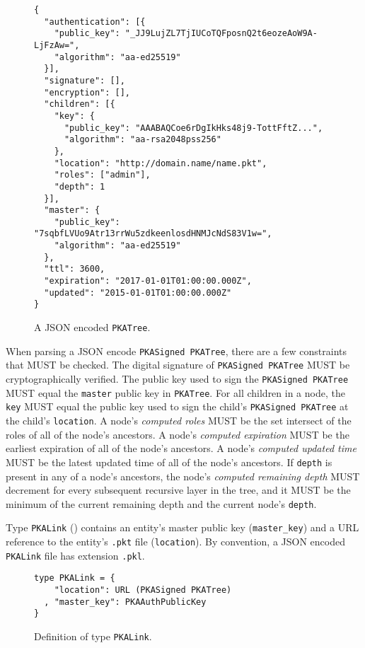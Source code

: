 \documentclass{article}
\newcommand{\pkap}{PKAP}
\newcommand{\todo}[1]{\textcolor{red}{#1}}
\begin{document}
\begin{figure}[h!]
\begin{lstlisting}
{
  "authentication": [{
    "public_key": "_JJ9LujZL7TjIUCoTQFposnQ2t6eozeAoW9A-LjFzAw=",
    "algorithm": "aa-ed25519"
  }],
  "signature": [],
  "encryption": [],
  "children": [{
    "key": {
      "public_key": "AAABAQCoe6rDgIkHks48j9-TottFftZ...",
      "algorithm": "aa-rsa2048pss256"
    },
    "location": "http://domain.name/name.pkt",
    "roles": ["admin"],
    "depth": 1
  }],
  "master": {
    "public_key": "7sqbfLVUo9Atr13rrWu5zdkeenlosdHNMJcNdS83V1w=",
    "algorithm": "aa-ed25519"
  },
  "ttl": 3600,
  "expiration": "2017-01-01T01:00:00.000Z",
  "updated": "2015-01-01T01:00:00.000Z"
}
\end{lstlisting}
\caption{A JSON encoded \texttt{PKATree}.}
\label{example:pkatree:tree}
\end{figure}


When parsing a JSON encode \texttt{PKASigned PKATree}, there are a few constraints that MUST be checked. 
The digital signature of \texttt{PKASigned PKATree} MUST be cryptographically verified. 
The public key used to sign the \texttt{PKASigned PKATree} MUST equal the \texttt{master} public key in \texttt{PKATree}. 
For all children in a node, the \texttt{key} MUST equal the public key used to sign the child's \texttt{PKASigned PKATree} at the child's \texttt{location}. 
A node's \emph{computed roles} MUST be the set intersect of the roles of all of the node's ancestors. 
A node's \emph{computed expiration} MUST be the earliest expiration of all of the node's ancestors. 
A node's \emph{computed updated time} MUST be the latest updated time of all of the node's ancestors. 
If \texttt{depth} is present in any of a node's ancestors, the node's \emph{computed remaining depth} MUST decrement for every subsequent recursive layer in the tree, and it MUST be the minimum of the current remaining depth and the current node's \texttt{depth}. 

Type \texttt{PKALink} () contains an entity's master public key (\texttt{master\_key}) and a URL reference to the entity's \texttt{.pkt} file (\texttt{location}). 
By convention, a JSON encoded \texttt{PKALink} file has extension \texttt{.pkl}. 


\begin{figure}[h!]
\begin{lstlisting}
type PKALink = {
    "location": URL (PKASigned PKATree)
  , "master_key": PKAAuthPublicKey
}
\end{lstlisting}
\caption{Definition of type \texttt{PKALink}.}
\label{code:pkalink}
\end{figure}
\end{document}
